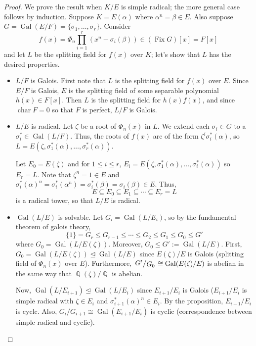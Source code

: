\documentclass[11pt, a4paper]{memoir}
\DeclareMathOperator{\Q}{{\mathbb{Q}}}
\theoremstyle{change}
\theoremstyle{plain}
\theoremstyle{nonumberplain}
\newtheorem{proof}{Proof}
\DeclareMathOperator{\chr}{char}
\DeclareMathOperator{\Fix}{Fix}
\DeclareMathOperator{\Gal}{Gal}
\newcommand{\quot}[2]{\mathchoice{\left.\raisebox{0.14em}{$#1$}\middle/\raisebox{-0.14em}{$#2$}\right.}
                                 {\left.\raisebox{0.08em}{$#1$}\middle/\raisebox{-0.08em}{$#2$}\right.}
                                 {\left.\raisebox{0.03em}{$#1$}\middle/\raisebox{-0.03em}{$#2$}\right.}
                                 {\left.\raisebox{0em}{$#1$}\middle/\raisebox{0em}{$#2$}\right.}}
\newcommand{\trleq}{\trianglelefteq}
\numberwithin{equation}{section}
\begin{document}
\begin{proof}
    We prove the result when $K/E$ is simple radical; the more general case follows by induction.
    Suppose $K=E(\alpha)$ where $\alpha^n=\beta\in E$.
    Also suppose $G=\Gal(E/F)=\{\sigma_1,\ldots,\sigma_r\}$.
    Consider
    \begin{equation*}
        f(x)=\Phi_n\prod_{i=1}^r(x^n-\sigma_i(\beta))\in(\Fix G)[x]=F[x]
    \end{equation*}
    and let $L$ be the splitting field for $f(x)$ over $K$; let's show that $L$ has the desired properties.
    \begin{itemize}
        \item $L/F$ is Galois.
            First note that $L$ is the splitting field for $f(x)$ over $E$.
            Since $E/F$ is Galois, $E$ is the splitting field of some separable polynomial $h(x)\in F[x]$.
            Then $L$ is the splitting field for $h(x)f(x)$, and since $\chr F=0$ so that $F$ is perfect, $L/F$ is Galois.
        \item $L/E$ is radical.
            Let $\zeta$ be a root of $\Phi_n(x)$ in $L$.
            We extend each $\sigma_i\in G$ to a $\sigma_i^*\in\Gal(L/F)$.
            Thus, the roots of $f(x)$ are of the form $\zeta^i\sigma_i^*(\alpha)$, so $L=E(\zeta,\sigma_1^*(\alpha),\ldots,\sigma_r^*(\alpha))$.

            Let $E_0=E(\zeta)$ and for $1\leq i\leq r$, $E_i=E(\zeta,\sigma_1^*(\alpha),\ldots,\sigma_i^*(\alpha))$ so $E_r=L$.
            Note that $\zeta^n=1\in E$ and $\sigma_i^*(\alpha)^n=\sigma_i^*(\alpha^n)=\sigma_i^*(\beta)=\sigma_i(\beta)\in E$.
            Thus,
            \begin{equation*}
                E\subseteq E_0\subseteq E_1\subseteq\cdots\subseteq E_r=L
            \end{equation*}
            is a radical tower, so that $L/E$ is radical.
        \item $\Gal(L/E)$ is solvable.
            Let $G_i=\Gal(L/E_i)$, so by the fundamental theorem of galois theory,
            \begin{equation*}
                \{1\}=G_r\leq G_{r-1}\leq\cdots\leq G_2\leq G_1\leq G_0\leq G'
            \end{equation*}
            where $G_0=\Gal(L/E(\zeta))$.
            Moreover, $G_0\leq G':=\Gal(L/E)$.
            First, $G_0=\Gal(L/E(\zeta))\trleq\Gal(L/E)$ since $E(\zeta)/E$ is Galois (splitting field of $\Phi_n(x)$ over $E$).
            Furthermore, $\quot{G'}{G_0}\cong\Gal(E(\zeta)/E)$ is abelian in the same way that $\Q(\zeta)/\Q$ is abelian.

            Now, $\Gal(L/E_{i+1})\trianglelefteq\Gal(L/E_i)$ since $E_{i+1}/E_i$ is Galois ($E_{i+1}/E_i$ is simple radical with $\zeta\in E_i$ and $\sigma_{i+1}^*(\alpha)^n\in E_i$.
            By the proposition, $E_{i+1}/E_i$ is cyclc.
            Also, $G_i/G_{i+1}\cong\Gal(E_{i+1}/E_i)$ is cyclic (correspondence between simple radical and cyclic).
    \end{itemize}
\end{proof}
\end{document}
